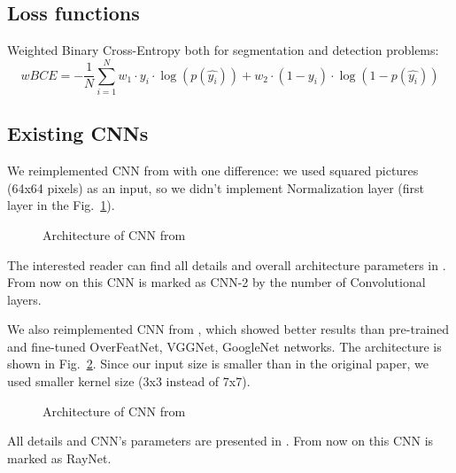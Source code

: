 \subsection{Loss functions}
Weighted Binary Cross-Entropy both for segmentation and detection problems:
\begin{equation}
wBCE =-\frac{1}{N} \sum_{i=1}^{N} w_{1} \cdot y_{i} \cdot \log \left(p\left(\hat{y_{i}}\right)\right)
+ w_{2} \cdot \left(1-y_{i}\right) \cdot \log \left(1-p\left(\hat{y_{i}}\right)\right)
\end{equation}

\subsection{Existing CNNs}

We reimplemented CNN from \cite{Feng2017} with one difference: we used squared pictures (64x64 pixels) as an input, so we didn't implement Normalization layer (first layer in the Fig.~\ref{ris:CNN_feng2017}).
\begin{figure}[ht]
	\caption{Architecture of CNN from \cite{Feng2017}}
	\label{ris:CNN_feng2017}
\end{figure}
The interested reader can find all details and overall architecture parameters in \cite{Feng2017}.
From now on this CNN is marked as CNN-2 by the number of Convolutional layers.

We also reimplemented CNN from \cite{2020a}, which showed better results than pre-trained and fine-tuned OverFeatNet, VGGNet, GoogleNet networks.
The architecture is shown in Fig.~\ref{ris:raynet}.
Since our input size is smaller than in the original paper, we used smaller kernel size (3x3 instead of 7x7).
\begin{figure}[ht]
	\caption{Architecture of CNN from \cite{2020a}}
	\label{ris:raynet}
\end{figure}
All details and CNN's parameters are presented in \cite{2020a}.
From now on this CNN is marked as RayNet.

